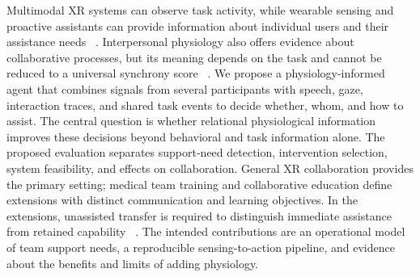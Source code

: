 Multimodal XR systems can observe task activity, while wearable sensing and proactive assistants can provide information about individual users and their assistance needs ~\cite{p37,pro2,guide,sensing}. Interpersonal physiology also offers evidence about collaborative processes, but its meaning depends on the task and cannot be reduced to a universal synchrony score ~\cite{p32,p49,huang}. We propose a physiology-informed agent that combines signals from several participants with speech, gaze, interaction traces, and shared task events to decide whether, whom, and how to assist. The central question is whether relational physiological information improves these decisions beyond behavioral and task information alone. The proposed evaluation separates support-need detection, intervention selection, system feasibility, and effects on collaboration. General XR collaboration provides the primary setting; medical team training and collaborative education define extensions with distinct communication and learning objectives. In the extensions, unassisted transfer is required to distinguish immediate assistance from retained capability ~\cite{p62}. The intended contributions are an operational model of team support needs, a reproducible sensing-to-action pipeline, and evidence about the benefits and limits of adding physiology.

